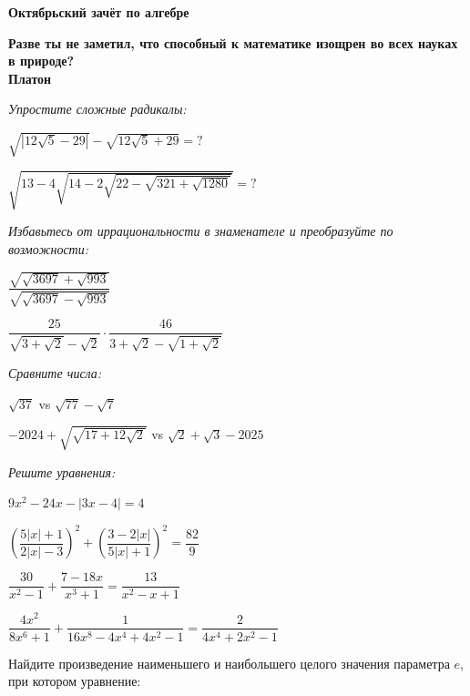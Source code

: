 \centerline{\bf \Huge Октябрьский зачёт по алгебре }

\begin{flushright}
        \scriptsize{\textbf{Разве ты не заметил, что способный к математике изощрен во всех науках в природе?\\
         Платон}}
        
\end{flushright}



\centerline{\textit{Упростите сложные радикалы:}}

  $\sqrt{|12\sqrt{5} -  29|} - \sqrt{12\sqrt{5} +  29}=?$

 $\sqrt{13-4\sqrt{14-2\sqrt{22-\sqrt{321+\sqrt{1280}}}}}=?$

\hspace{3mm}

\centerline{\textit{Избавьтесь от иррациональности в знаменателе и преобразуйте по возможности:}}

 $\dfrac{\sqrt{\sqrt{3697} + \sqrt{993}}}{\sqrt{\sqrt{3697} - \sqrt{993}}}$

 $\dfrac{25}{\sqrt{3 + \sqrt{2}}-\sqrt{2}} \cdot \dfrac{46}{3+\sqrt{2}-\sqrt{1 + \sqrt{2}}}$




\centerline{\textit{ Сравните числа:}}

 $\sqrt{37}$ vs $\sqrt{77}-\sqrt{7}$

 $-2024+\sqrt{\sqrt{17+12\sqrt{2}}}$ vs $\sqrt{2}+\sqrt{3}-2025$

 \hspace{3mm}

\centerline{\textit{ Решите уравнения:}}

 $9x^2-24x-|3x-4|=4$

  $\left(\dfrac{5|x|+1}{2|x|-3}\right)^2 + \left(\dfrac{3-2|x|}{5|x|+1}\right)^2 = \dfrac{82}{9}$

 \hspace{3mm}


 $\dfrac{30}{x^2-1} + \dfrac{7-18x}{x^3+1}=\dfrac{13}{x^2-x+1}$

 $\dfrac{4x^2}{8x^6+1} + \dfrac{1}{16x^8-4x^4+4x^2-1}=\dfrac{2}{4x^4+2x^2-1}$

 \hspace{3mm}

  Найдите произведение наименьшего и наибольшего целого значения параметра $e$, при котором уравнение:
 
